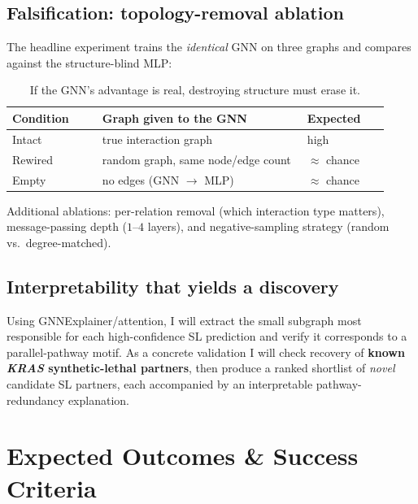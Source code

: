 \documentclass[11pt]{article}
\begin{document}
\subsection{Falsification: topology-removal ablation}
The headline experiment trains the \emph{identical} GNN on three graphs and
compares against the structure-blind MLP:
\begin{table}[h]
\centering
\small
\begin{tabular}{>{\raggedright\arraybackslash}p{0.22\linewidth} >{\raggedright\arraybackslash}p{0.50\linewidth} >{\raggedright\arraybackslash}p{0.20\linewidth}}
\toprule
\rowcolor{sriblue}\color{white}\textbf{Condition} & \color{white}\textbf{Graph given to the GNN} & \color{white}\textbf{Expected}\\
\midrule
\rowcolor{srirow} Intact & true interaction graph & high\\
Rewired & random graph, same node/edge count & $\approx$ chance\\
\rowcolor{srirow} Empty & no edges (GNN $\to$ MLP) & $\approx$ chance\\
\bottomrule
\end{tabular}
\caption{If the GNN's advantage is real, destroying structure must erase it.}
\label{tab:ablation}
\end{table}

\noindent Additional ablations: per-relation removal (which interaction type
matters), message-passing depth ($1$--$4$ layers), and negative-sampling
strategy (random vs.\ degree-matched).

\subsection{Interpretability that yields a discovery}
Using GNNExplainer/attention, I will extract the small subgraph most
responsible for each high-confidence SL prediction and verify it corresponds to
a parallel-pathway motif. As a concrete validation I will check recovery of
\textbf{known \textit{KRAS} synthetic-lethal partners}, then produce a ranked
shortlist of \emph{novel} candidate SL partners, each accompanied by an
interpretable pathway-redundancy explanation.

\section{Expected Outcomes \& Success Criteria}
\end{document}
